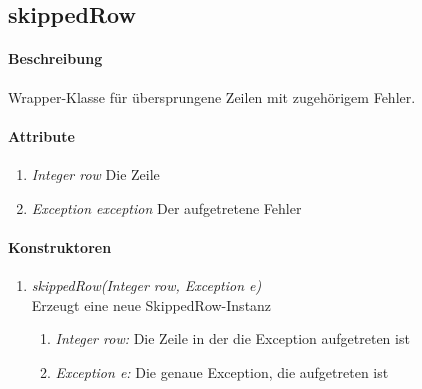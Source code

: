 \subsection*{skippedRow}\label{srow}

\paragraph{Beschreibung}
Wrapper-Klasse für übersprungene Zeilen mit zugehörigem Fehler.


\paragraph{Attribute}

\begin{enumerate}[$\bullet$]
	\item \textit{Integer row} Die Zeile
	\item \textit{Exception exception} Der aufgetretene Fehler
\end{enumerate}



\paragraph{Konstruktoren}
\begin{enumerate}[+]
	\item \textit{skippedRow(Integer row, Exception e)} \\
	Erzeugt eine neue SkippedRow-Instanz
	\begin{enumerate}[$\bullet$]
		\item \textit{Integer row:} Die Zeile in der die Exception aufgetreten ist
		\item \textit{Exception e:} Die genaue Exception, die aufgetreten ist
	\end{enumerate}	
\end{enumerate}

